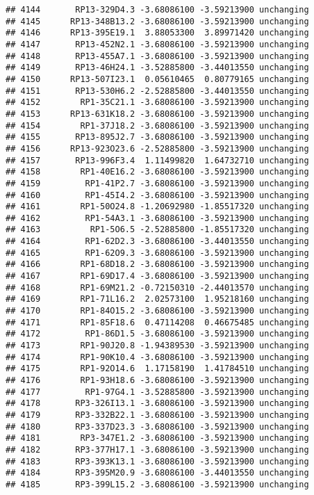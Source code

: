 \documentclass[]{article}
\begin{document}
\begin{verbatim}
## 4144       RP13-329D4.3 -3.68086100 -3.59213900 unchanging
## 4145      RP13-348B13.2 -3.68086100 -3.59213900 unchanging
## 4146      RP13-395E19.1  3.88053300  3.89971420 unchanging
## 4147       RP13-452N2.1 -3.68086100 -3.59213900 unchanging
## 4148       RP13-455A7.1 -3.68086100 -3.59213900 unchanging
## 4149       RP13-46H24.1 -3.52885800 -3.44013550 unchanging
## 4150      RP13-507I23.1  0.05610465  0.80779165 unchanging
## 4151       RP13-530H6.2 -2.52885800 -3.44013550 unchanging
## 4152        RP1-35C21.1 -3.68086100 -3.59213900 unchanging
## 4153      RP13-631K18.2 -3.68086100 -3.59213900 unchanging
## 4154        RP1-37J18.2 -3.68086100 -3.59213900 unchanging
## 4155       RP13-895J2.7 -3.68086100 -3.59213900 unchanging
## 4156      RP13-923O23.6 -2.52885800 -3.59213900 unchanging
## 4157       RP13-996F3.4  1.11499820  1.64732710 unchanging
## 4158        RP1-40E16.2 -3.68086100 -3.59213900 unchanging
## 4159         RP1-41P2.7 -3.68086100 -3.59213900 unchanging
## 4160         RP1-45I4.2 -3.68086100 -3.59213900 unchanging
## 4161        RP1-50O24.8 -1.20692980 -1.85517320 unchanging
## 4162         RP1-54A3.1 -3.68086100 -3.59213900 unchanging
## 4163          RP1-5O6.5 -2.52885800 -1.85517320 unchanging
## 4164         RP1-62D2.3 -3.68086100 -3.44013550 unchanging
## 4165         RP1-62O9.3 -3.68086100 -3.59213900 unchanging
## 4166        RP1-68D18.2 -3.68086100 -3.59213900 unchanging
## 4167        RP1-69D17.4 -3.68086100 -3.59213900 unchanging
## 4168        RP1-69M21.2 -0.72150310 -2.44013570 unchanging
## 4169        RP1-71L16.2  2.02573100  1.95218160 unchanging
## 4170        RP1-84O15.2 -3.68086100 -3.59213900 unchanging
## 4171        RP1-85F18.6  0.47114208  0.46675485 unchanging
## 4172         RP1-86D1.5 -3.68086100 -3.59213900 unchanging
## 4173        RP1-90J20.8 -1.94389530 -3.59213900 unchanging
## 4174        RP1-90K10.4 -3.68086100 -3.59213900 unchanging
## 4175        RP1-92O14.6  1.17158190  1.41784510 unchanging
## 4176        RP1-93H18.6 -3.68086100 -3.59213900 unchanging
## 4177         RP1-97G4.1 -3.52885800 -3.59213900 unchanging
## 4178       RP3-326I13.1 -3.68086100 -3.59213900 unchanging
## 4179       RP3-332B22.1 -3.68086100 -3.59213900 unchanging
## 4180       RP3-337D23.3 -3.68086100 -3.59213900 unchanging
## 4181        RP3-347E1.2 -3.68086100 -3.59213900 unchanging
## 4182       RP3-377H17.1 -3.68086100 -3.59213900 unchanging
## 4183       RP3-393K13.1 -3.68086100 -3.59213900 unchanging
## 4184       RP3-395M20.9 -3.68086100 -3.44013550 unchanging
## 4185       RP3-399L15.2 -3.68086100 -3.59213900 unchanging

\end{verbatim}
\end{document}

